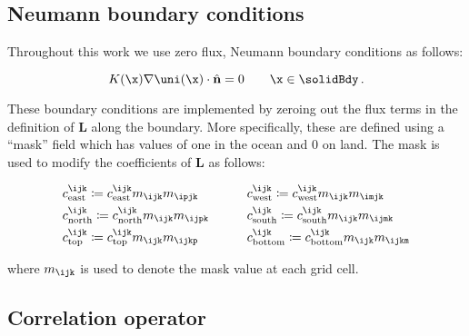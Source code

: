 \documentclass[alpha-refs]{wiley-article}
\begin{document}
\subsection{Neumann boundary conditions}
\label{ssec:boundary_conditions}

Throughout this work we use zero flux, Neumann boundary conditions as follows:
\begin{linenomath*}\begin{equation*}
    K(\x)\nabla\uni(\x) \cdot \hat{\mathbf{n}} = 0 \qquad \x\in\solidBdy \, .
\end{equation*}\end{linenomath*}
These boundary conditions are implemented by zeroing out the flux terms in the
definition of $\mathbf{L}$ along the boundary.
More specifically, these are defined using a ``mask'' field which has
values of one in the ocean and 0 on land.
The mask is used to modify the coefficients of $\mathbf{L}$ as follows:
\begin{linenomath*}\begin{equation*}
    \begin{aligned}
        &c_\text{east}^\ijk \coloneqq c_\text{east}^\ijk
            m_{\ijk} m_{\ipjk}
        \qquad
        &&c_\text{west}^\ijk \coloneqq c_\text{west}^\ijk
            m_{\ijk} m_{\imjk}
        \\
        &c_\text{north}^\ijk \coloneqq c_\text{north}^\ijk
            m_{\ijk} m_{\ijpk}
        \qquad
        &&c_\text{south}^\ijk \coloneqq c_\text{south}^\ijk
            m_{\ijk} m_{\ijmk}
        \\
        &c_\text{top}^\ijk \coloneqq c_\text{top}^\ijk
            m_{\ijk} m_{\ijkp}
        \qquad
        &&c_\text{bottom}^\ijk \coloneqq c_\text{bottom}^\ijk
            m_{\ijk} m_{\ijkm}
    \end{aligned}
\end{equation*}\end{linenomath*}
where $m_{\ijk}$ is used to denote the mask value at each grid cell.

\subsection{Correlation operator}
\label{ssec:correlation_fv}
\end{document}
